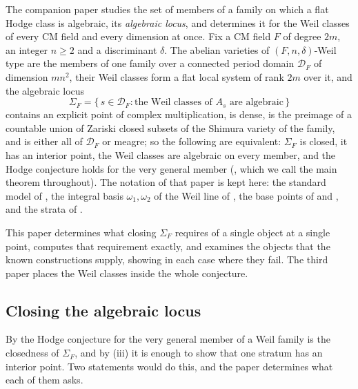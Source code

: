 \documentclass[11pt,reqno]{amsart}
\theoremstyle{plain}
\theoremstyle{definition}
\theoremstyle{remark}
\newcommand{\cD}{\mathcal{D}}
\begin{document}
The companion paper \cite{paperI} studies the set of members of a family on
which a flat Hodge class is algebraic, its \emph{algebraic locus}, and
determines it for the Weil classes of every CM field and every dimension at
once. Fix a CM field $F$ of degree $2m$, an integer $n\ge2$ and a
discriminant $\delta$. The abelian varieties of $(F,n,\delta)$-Weil type are
the members of one family over a connected period domain $\cD_{F}$ of
dimension $mn^{2}$, their Weil classes form a flat local system of rank $2m$
over it, and the algebraic locus
\[
  \Sigma_{F}=\{\,s\in\cD_{F}:\text{the Weil classes of }A_{s}\text{ are
  algebraic}\,\}
\]
contains an explicit point of complex multiplication, is dense, is the
preimage of a countable union of Zariski closed subsets of the Shimura
variety of the family, and is either all of $\cD_{F}$ or meagre; so the
following are equivalent: $\Sigma_{F}$ is closed, it has an interior point,
the Weil classes are algebraic on every member, and the Hodge conjecture
holds for the very general member (\cite[Theorem~1.1]{paperI}, which we call the main
theorem throughout). The notation of that paper is kept here: the standard
model of \cite[Section~4]{paperI}, the integral basis $\omega_{1},\omega_{2}$ of
the Weil line of \cite[Theorem~4.9]{paperI}, the base points of
\cite[Theorem~15.27]{paperI} and \cite[Theorem~17.5]{paperI}, and the strata of
\cite[Theorem~16.4]{paperI}.

This paper determines what closing $\Sigma_{F}$ requires of a single object
at a single point, computes that requirement exactly, and examines the
objects that the known constructions supply, showing in each case where they
fail. The third paper \cite{paperIII} places the Weil classes inside the
whole conjecture.

\subsection{Closing the algebraic locus}

By \cite[Theorem~1.1(iv)]{paperI} the Hodge conjecture for the very general member of a
Weil family is the closedness of $\Sigma_{F}$, and by (iii) it is enough to
show that one stratum has an interior point. Two statements would do this,
and the paper determines what each of them asks.
\end{document}
